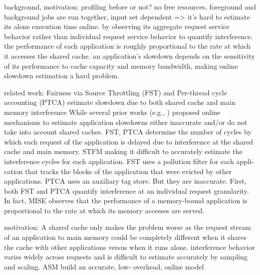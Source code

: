 \documentclass[UTF8]{article}
\begin{document}
    background, motivation: profiling before or not?  no free resources, foreground and background jobs are run together, input set dependent => it's hard to estimate its alone execution time online.   by observing its aggregate request service behavior rather than individual request service behavior to quantify interference.  the performance of each application is roughly proportional to the rate at which it accesses the shared cache.   an application’s slowdown depends on the sensitivity of its performance to cache capacity and memory bandwidth, making online slowdown estimation a hard problem.  
    
    related work: Fairness via Source Throttling (FST) \cite{ebrahimi2010fairness}  and Per-thread cycle accounting (PTCA) \cite{du2013per} estimate slowdown due to both shared cache and main memory interference While several prior works (e.g., \cite{ebrahimi2010fairness,du2013per, mutlu2007stall,subramanian2013mise}) proposed online mechanisms to estimate application slowdowns either inaccurate and/or do not take into account shared caches. FST, PTCA determine the number of cycles by which each request of the application is delayed due to interference at the shared cache and main memory.   STFM \cite{mutlu2007stall} making it difficult to accurately estimate the interference cycles for each application. FST uses a pollution filter for each appli- cation that tracks the blocks of the application that were evicted by other applications. PTCA uses an auxiliary tag store. But they are inaccurate. First, both FST and PTCA quantify interference at an individual request granularity.  In fact, MISE \cite{subramanian2013mise} observes that the performance of a memory-bound application is proportional to the rate at which its memory accesses are served.
    
    motivation: A shared cache only makes the problem worse as the request stream of an application to main memory could be completely different when it shares the cache with other applications versus when it runs alone.  interference behavior varies widely across requests and is difficult to estimate accurately by sampling and scaling. ASM build an accurate, low- overhead, online model
    
\end{document}
